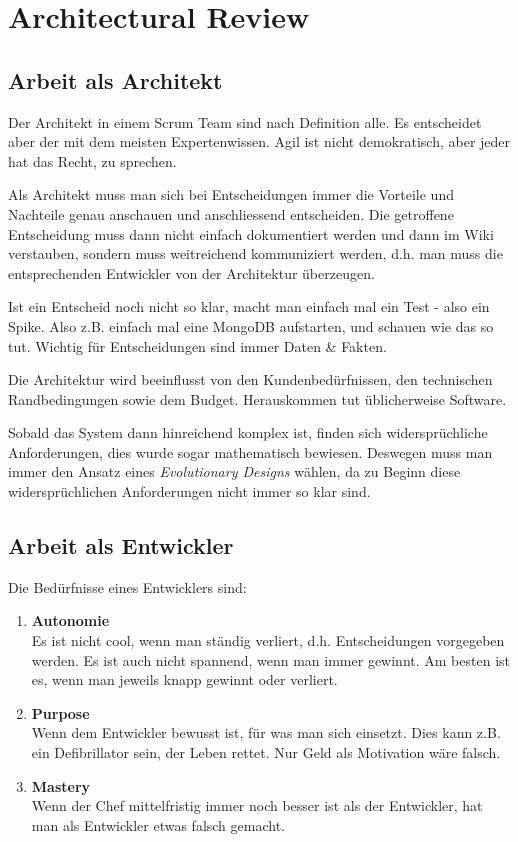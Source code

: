 \chapter{Architectural Review}
\section{Arbeit als Architekt}
Der Architekt in einem Scrum Team sind nach Definition alle. Es entscheidet aber der mit dem meisten Expertenwissen. Agil ist nicht demokratisch, aber jeder hat das Recht, zu sprechen.

Als Architekt muss man sich bei Entscheidungen immer die Vorteile und Nachteile genau anschauen und anschliessend entscheiden. Die getroffene Entscheidung muss dann nicht einfach dokumentiert werden und dann im Wiki verstauben, sondern muss weitreichend kommuniziert werden, d.h. man muss die entsprechenden Entwickler von der Architektur überzeugen.

Ist ein Entscheid noch nicht so klar, macht man einfach mal ein Test - also ein Spike. Also z.B. einfach mal eine MongoDB aufstarten, und schauen wie das so tut. Wichtig für Entscheidungen sind immer Daten \& Fakten. 

Die Architektur wird beeinflusst von den Kundenbedürfnissen, den technischen Randbedingungen sowie dem Budget. Herauskommen tut üblicherweise Software. 

Sobald das System dann hinreichend komplex ist, finden sich widersprüchliche Anforderungen, dies wurde sogar mathematisch bewiesen. Deswegen muss man immer den Ansatz eines \textit{Evolutionary Designs} wählen, da zu Beginn diese widersprüchlichen Anforderungen nicht immer so klar sind.


\section{Arbeit als Entwickler}
Die Bedürfnisse eines Entwicklers sind:
\begin{enumerate}
	\item \textbf{Autonomie} \\
		Es ist nicht cool, wenn man ständig verliert, d.h. Entscheidungen vorgegeben werden. Es ist auch nicht spannend, wenn man immer gewinnt. Am besten ist es, wenn man jeweils knapp gewinnt oder verliert.
	\item \textbf{Purpose} \\
		Wenn dem Entwickler bewusst ist, für was man sich einsetzt. Dies kann z.B. ein Defibrillator sein, der Leben rettet. Nur Geld als Motivation wäre falsch.
	\item \textbf{Mastery} \\
		Wenn der Chef mittelfristig immer noch besser ist als der Entwickler, hat man als Entwickler etwas falsch gemacht.
\end{enumerate}

